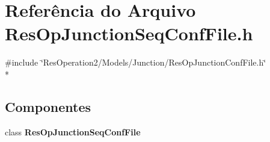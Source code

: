 \section{Referência do Arquivo Res\+Op\+Junction\+Seq\+Conf\+File.\+h}
\label{_res_op_junction_seq_conf_file_8h}
{\ttfamily \#include \char`\"{}Res\+Operation2/\+Models/\+Junction/\+Res\+Op\+Junction\+Conf\+File.\+h\char`\"{}}\\*
\subsection*{Componentes}
\begin{DoxyCompactItemize}
\item 
class {\bf Res\+Op\+Junction\+Seq\+Conf\+File}
\end{DoxyCompactItemize}
